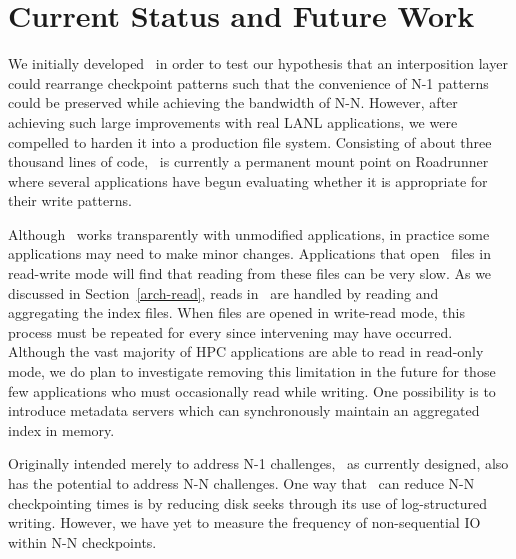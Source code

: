 \section{Current Status and Future Work}
\label{future}

We initially developed \plfs\ in order to test our hypothesis that an
interposition layer could rearrange checkpoint patterns such that the
convenience of N-1 patterns could be preserved while achieving the bandwidth of
N-N.  However, after achieving such large improvements with real LANL
applications, we were compelled to harden it 
into a production file system. Consisting of about three thousand lines of
code, \plfs\ is currently a permanent mount point on Roadrunner where several
applications have begun evaluating whether it is appropriate for their write 
patterns.


Although \plfs\ works transparently with unmodified applications, in practice
some applications may need to make minor changes.  Applications that open
\plfs\ files in read-write mode will find that reading from these files can be
very slow.  As we discussed in Section~\ref{arch-read}, reads in \plfs\ are
handled by reading and aggregating the index files.  When files are opened in
write-read mode, this process must be repeated for every  since
intervening  may have occurred.  Although the vast majority of
HPC applications are able to read in read-only mode, we do plan to investigate
removing this limitation in the future for those few applications who must occasionally
read while writing.  One possibility is to introduce metadata
servers which can synchronously maintain an aggregated index in memory. 

Originally intended merely to address N-1 challenges, \plfs\, as currently
designed, also has the potential to address N-N challenges.  One way that
\plfs\ can reduce N-N checkpointing times is by reducing disk seeks through its
use of log-structured writing.  However, we have yet to measure the
frequency of non-sequential IO within N-N checkpoints.

